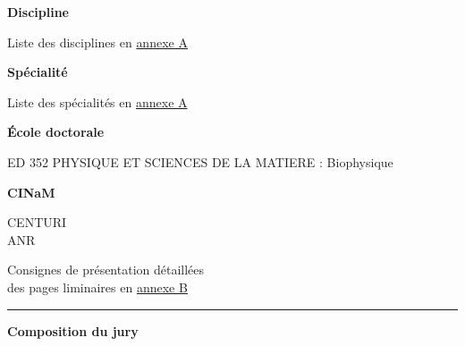\vspace{4em}

\begin{center}
	\begin{minipage}[t]{.45\linewidth}
    	    \vspace{.5em}
        	\textsf{\textbf{Discipline}}
        	
        	\textsf{Liste des disciplines en \hyperref[chap:doctorats]{annexe A}}
        	
    	    \vspace{1em}
        	\textsf{\textbf{Spécialité}}
        	
        	\textsf{Liste des spécialités en \hyperref[chap:doctorats]{annexe A}}
        	
    	    \vspace{2em}
        	\textsf{\textbf{École doctorale}}
        	
        	\textsf{ED 352 PHYSIQUE ET SCIENCES DE LA MATIERE : Biophysique}
        	
    	    \vspace{1em}
        	\textsf{\textbf{CINaM}}
        	
        	\textsf{CENTURI\\
        	ANR
        	}

    	    \vspace{3em}
        	\textsf{Consignes de présentation détaillées\\
			des pages liminaires en \hyperref[chap:consignes]{annexe B}}
	\end{minipage}\hfill
	\begin{minipage}[t]{.03\linewidth}
	    \rule[-280pt]{1pt}{280pt}
	\end{minipage}\hfill
	\begin{minipage}[t]{.52\linewidth}
	    \vspace{.5em}
    	\textsf{\textbf{Composition du jury}}


\end{minipage}
\end{center}
